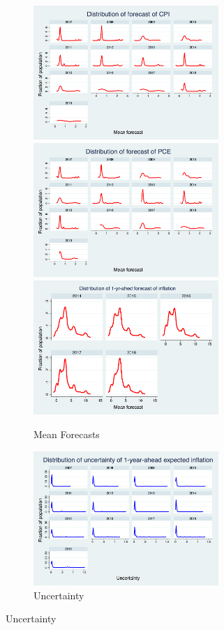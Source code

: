 \documentclass[12pt]{article}
\begin{document}
	
	\begin{figure}[ht]
		\begin{subfigure}[b]{0.5\textwidth}
		\centering
		\caption{Mean Forecasts}
		\includegraphics[width=7cm]{figures/PRCCPIMean1_hist.png} 
		\smallskip
		\includegraphics[width=7cm]{figures/PRCPCEMean1_hist.png} 
		\smallskip
		\includegraphics[width=7cm]{figures/SCEmean_hist.png} 
		\end{subfigure}
	   \hfill 
	  	\begin{subfigure}[b]{0.5\textwidth}
	  	\caption{Uncertainty}
		\includegraphics[width=7cm]{figures/PRCCPIVar1_hist.png}  

\end{subfigure}
\end{figure}
\end{document}
